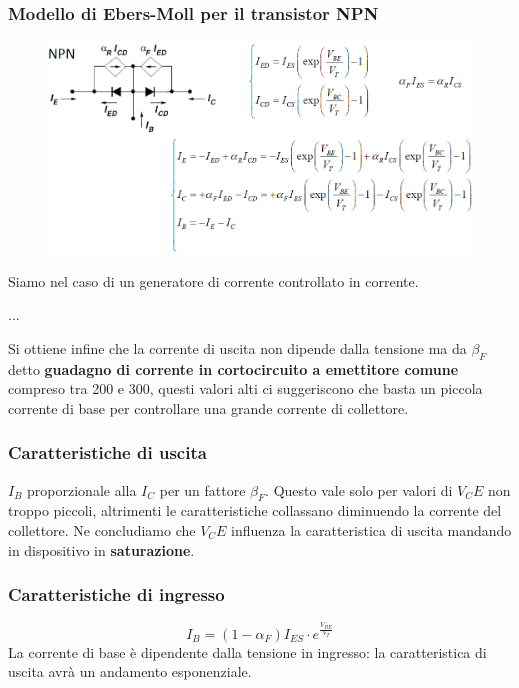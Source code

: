 \documentclass[11pt,a4paper,]{article}
\begin{document}
\subsubsection{Modello di Ebers-Moll per il transistor NPN}
\begin{figure}[H]
    \centering
    \includegraphics[width=0.75\linewidth]{img/eb per npn.png}
\end{figure}
Siamo nel caso di un generatore di corrente controllato in corrente.

...

Si ottiene infine che la corrente di uscita non dipende dalla tensione ma da $\beta_F$ detto \textbf{guadagno di corrente in cortocircuito a emettitore comune} compreso tra 200 e 300, questi valori alti ci suggeriscono che basta un piccola corrente di base per controllare una grande corrente di collettore.
\subsubsection{Caratteristiche di uscita}
$I_B$ proporzionale alla $I_C$ per un fattore $\beta_F$.
Questo vale solo per valori di $V_CE$ non troppo piccoli, altrimenti le caratteristiche collassano diminuendo la corrente del collettore.
Ne concludiamo che $V_CE$ influenza la caratteristica di uscita mandando in dispositivo in \textbf{saturazione}.
\subsubsection{Caratteristiche di ingresso}
\[
I_B = (1 - \alpha_F)I_{ES} \cdot e^{\frac{V_{BE}}{V_T}}
\]
La corrente di base è dipendente dalla tensione in ingresso: la caratteristica di uscita avrà un andamento esponenziale.
\end{document}

